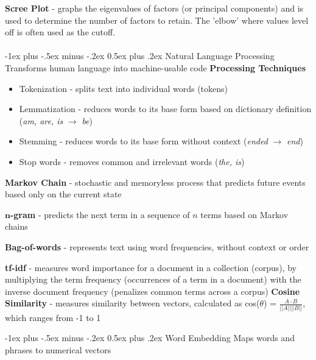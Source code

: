 \documentclass[10pt,landscape]{article}
\makeatletter
\renewcommand{\section}{\@startsection{section}{1}{0mm}%
                                {-1ex plus -.5ex minus -.2ex}%
                                {0.5ex plus .2ex}%
                                {\normalfont\large\bfseries}}
\renewcommand{\subsection}{\@startsection{subsection}{2}{0mm}%
                                {-1ex plus -.5ex minus -.2ex}%
                                {0.5ex plus .2ex}%
                                {\normalfont\normalsize\bfseries}}
\makeatother
\begin{document}
\begin{multicols}{3}
\smallskip
\textbf{Scree Plot} - graphs the eigenvalues of factors (or principal components) and is used to determine the number of factors to retain. The 'elbow' where values level off is often used as the cutoff.
\columnbreak
\\\textcolor{white}{.}\vspace{-5mm}\\ %
\section{Natural Language Processing}
Transforms human language into machine-usable code
\textbf{Processing Techniques}
\begin{itemize}[label={--},leftmargin=4mm]
\itemsep -.4mm
\item Tokenization - splits text into individual words (tokens)
\item Lemmatization - reduces words to its base form based on dictionary definition (\emph{am, are, is} $\to$ \emph{be})
\item Stemming - reduces words to its base form without context (\emph{ended} $\to$ \emph{end})
\item Stop words - removes common and irrelevant words (\emph{the, is})
\end{itemize}

\textbf{Markov Chain} - stochastic and memoryless process that predicts future events based only on the current state

$\boldsymbol{n}$\textbf{-gram} - predicts the next term in a sequence of $n$ terms based on Markov chains

\textbf{Bag-of-words} - represents text using word frequencies, without context or order

\textbf{tf-idf} - measures word importance for a document in a collection (corpus), by multiplying the term frequency (occurrences of a term in a document) with the inverse document frequency (penalizes common terms across a corpus)
\textbf{Cosine Similarity} - measures similarity between vectors, calculated as cos($\theta$) =
$\frac{A\cdot B}{||A||||B||} $, which ranges from -1 to 1

\subsection{Word Embedding}
Maps words and phrases to numerical vectors


\end{multicols}
\end{document}
